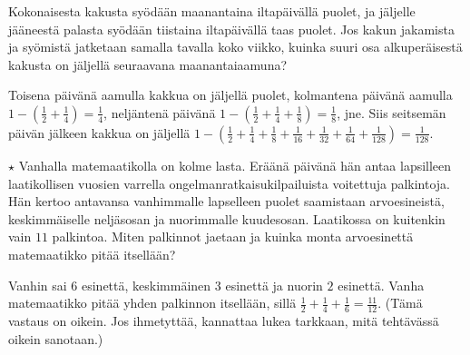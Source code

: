 \begin{tehtavasivu}
\begin{tehtava}
	Kokonaisesta kakusta syödään maanantaina iltapäivällä puolet, ja jäljelle jääneestä palasta syödään tiistaina iltapäivällä taas puolet. Jos kakun jakamista ja syömistä jatketaan samalla tavalla koko viikko, kuinka suuri osa alkuperäisestä kakusta on jäljellä seuraavana maanantaiaamuna?
	\begin{vastaus}
		Toisena päivänä aamulla kakkua on jäljellä puolet, kolmantena päivänä aamulla
		$1-\left(\frac{1}{2} + \frac{1}{4}\right) = \frac{1}{4}$, 
		neljäntenä päivänä
		$1-\left(\frac{1}{2} + \frac{1}{4} + \frac{1}{8}\right)
		= \frac{1}{8}$, jne.
		Siis seitsemän päivän jälkeen kakkua on jäljellä
		$1-\left(\frac{1}{2} + \frac{1}{4} + \frac{1}{8} +
		\frac{1}{16} + \frac{1}{32} + \frac{1}{64} + \frac{1}{128}\right)
		= \frac{1}{128}$.  
	\end{vastaus}
\end{tehtava}

\begin{tehtava}
	$\star$ Vanhalla matemaatikolla on kolme lasta. Eräänä päivänä hän antaa lapsilleen laatikollisen vuosien varrella ongelmanratkaisukilpailuista voitettuja palkintoja. Hän kertoo antavansa vanhimmalle lapselleen puolet saamistaan arvoesineistä, keskimmäiselle neljäsosan ja nuorimmalle kuudesosan. Laatikossa on kuitenkin vain $11$ palkintoa. Miten  palkinnot jaetaan ja kuinka monta arvoesinettä matemaatikko pitää itsellään?
	\begin{vastaus}
		Vanhin sai $6$ esinettä, keskimmäinen $3$ esinettä ja nuorin $2$ esinettä. Vanha matemaatikko pitää yhden palkinnon itsellään, sillä $\frac{1}{2} + \frac{1}{4} + \frac{1}{6} = \frac{11}{12}$. (Tämä vastaus on oikein. Jos ihmetyttää, kannattaa lukea tarkkaan, mitä tehtävässä oikein sanotaan.)
	\end{vastaus}
\end{tehtava}

\end{tehtavasivu}
